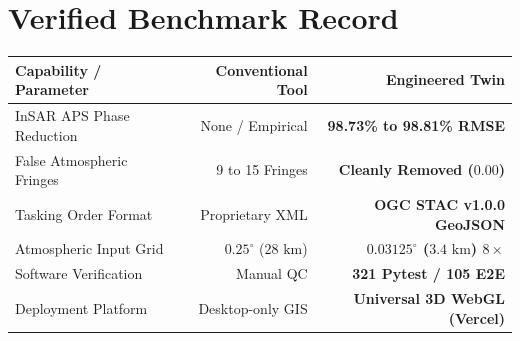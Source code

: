 \documentclass[10pt,letterpaper]{article}
\begin{document}
\begin{minipage}[t]{0.51\textwidth}
    \section*{Verified Benchmark Record}
    \footnotesize
    \begin{tabularx}{\linewidth}{X r r}
        \toprule
        \textbf{Capability / Parameter} & \textbf{Conventional Tool} & \textbf{Engineered Twin} \\
        \midrule
        InSAR APS Phase Reduction & None / Empirical & \textbf{98.73\% to 98.81\% RMSE} \\
        False Atmospheric Fringes & 9 to 15 Fringes & \textbf{Cleanly Removed ($0.00$)} \\
        Tasking Order Format & Proprietary XML & \textbf{OGC STAC v1.0.0 GeoJSON} \\
        Atmospheric Input Grid & $0.25^\circ$ ($28\text{ km}$) & \textbf{$0.03125^\circ$ ($3.4\text{ km}$) $8\times$} \\
        Software Verification & Manual QC & \textbf{321 Pytest / 105 E2E} \\
        Deployment Platform & Desktop-only GIS & \textbf{Universal 3D WebGL (Vercel)} \\
        \bottomrule
    \end{tabularx}
\end{minipage}
\hfill
\end{document}
